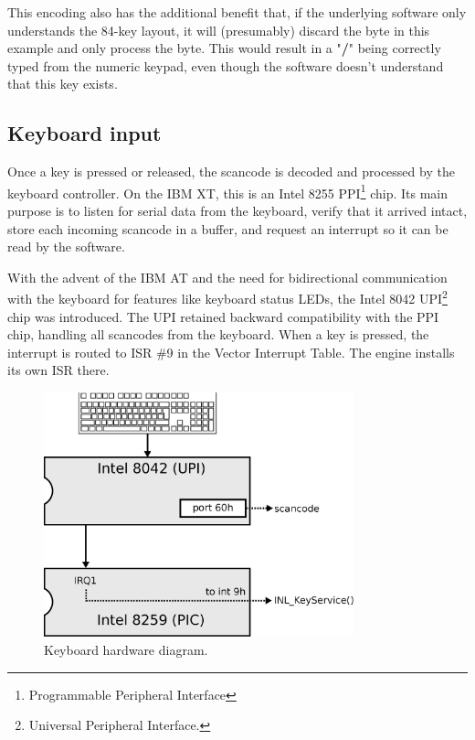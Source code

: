 \documentclass[book.tex]{subfiles}
\begin{document}
\par
This encoding also has the additional benefit that, if the underlying software only understands the 84-key layout, it will (presumably) discard the  byte in this example and only process the  byte. This would result in a "\textbf{/}" being correctly typed from the numeric keypad, even though the software doesn't understand that this key exists.\\




\subsection{Keyboard input}
Once a key is pressed or released, the scancode is decoded and processed by the keyboard controller. On the IBM XT, this is an Intel 8255 PPI\footnote{Programmable Peripheral Interface} chip. Its main purpose is to listen for serial data from the keyboard, verify that it arrived intact, store each incoming scancode in a buffer, and request an interrupt so it can be read by the software.\\

\par
With the advent of the IBM AT and the need for bidirectional communication with the keyboard for features like keyboard status LEDs, the Intel 8042 UPI\footnote{Universal Peripheral Interface.} chip was introduced. The UPI retained backward compatibility with the PPI chip, handling all scancodes from the keyboard. When a key is pressed, the interrupt is routed to ISR \#9 in the Vector Interrupt Table. The engine installs its own ISR there.\\

\par
\begin{figure}[H]
  \centering
  \includegraphics[width=0.8\textwidth]{imgs/drawings/keyboard.eps}
  \caption{Keyboard hardware diagram.}
  \label{fig:pc_keyboard}
\end{figure}
\end{document}

